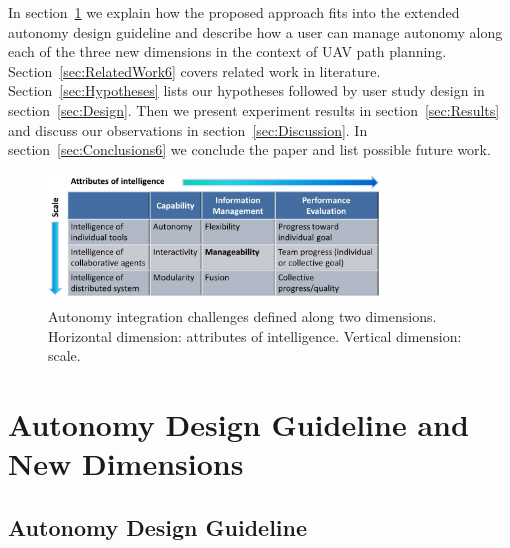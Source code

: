 \documentclass[journal]{IEEEtran}
\begin{document}
In section~\ref{sec:dimensions} we explain how the proposed approach fits into the extended autonomy design guideline and describe how a user can manage autonomy along each of the three new dimensions in the context of UAV path planning. Section~\ref{sec:RelatedWork6} covers related work in literature. Section~\ref{sec:Hypotheses} lists our hypotheses followed by user study design in section~\ref{sec:Design}. Then we present experiment results in section~\ref{sec:Results} and discuss our observations in section~\ref{sec:Discussion}. In section~\ref{sec:Conclusions6} we conclude the paper and list possible future work.

\begin{figure}
\centering
\includegraphics[width=3.5in]{IntegrationChallenges.JPG}
\caption{Autonomy integration challenges defined along two dimensions. Horizontal dimension: attributes of intelligence. Vertical dimension: scale.}
\label{IChallenges}
\end{figure}

\section{Autonomy Design Guideline and New Dimensions}
\label{sec:dimensions}

\subsection{Autonomy Design Guideline}
\end{document}
